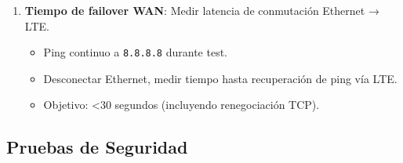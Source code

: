 \begin{enumerate}
    \item \textbf{Tiempo de failover WAN}: Medir latencia de conmutación Ethernet → LTE.
    \begin{itemize}
        \item Ping continuo a \texttt{8.8.8.8} durante test.
        \item Desconectar Ethernet, medir tiempo hasta recuperación de ping vía LTE.
        \item Objetivo: <30 segundos (incluyendo renegociación TCP).
    \end{itemize}
\end{enumerate}

\subsection{Pruebas de Seguridad}

